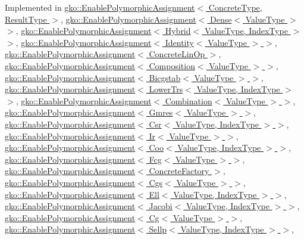 Implemented in \hyperlink{classgko_1_1EnablePolymorphicAssignment_a6b7e6872e96084636f8ab5091063ada8}{gko\+::\+Enable\+Polymorphic\+Assignment$<$ Concrete\+Type, Result\+Type $>$}, \hyperlink{classgko_1_1EnablePolymorphicAssignment_a6b7e6872e96084636f8ab5091063ada8}{gko\+::\+Enable\+Polymorphic\+Assignment$<$ Dense$<$ Value\+Type $>$ $>$}, \hyperlink{classgko_1_1EnablePolymorphicAssignment_a6b7e6872e96084636f8ab5091063ada8}{gko\+::\+Enable\+Polymorphic\+Assignment$<$ Hybrid$<$ Value\+Type, Index\+Type $>$ $>$}, \hyperlink{classgko_1_1EnablePolymorphicAssignment_a6b7e6872e96084636f8ab5091063ada8}{gko\+::\+Enable\+Polymorphic\+Assignment$<$ Identity$<$ Value\+Type $>$ $>$}, \hyperlink{classgko_1_1EnablePolymorphicAssignment_a6b7e6872e96084636f8ab5091063ada8}{gko\+::\+Enable\+Polymorphic\+Assignment$<$ Concrete\+Lin\+Op $>$}, \hyperlink{classgko_1_1EnablePolymorphicAssignment_a6b7e6872e96084636f8ab5091063ada8}{gko\+::\+Enable\+Polymorphic\+Assignment$<$ Composition$<$ Value\+Type $>$ $>$}, \hyperlink{classgko_1_1EnablePolymorphicAssignment_a6b7e6872e96084636f8ab5091063ada8}{gko\+::\+Enable\+Polymorphic\+Assignment$<$ Bicgstab$<$ Value\+Type $>$ $>$}, \hyperlink{classgko_1_1EnablePolymorphicAssignment_a6b7e6872e96084636f8ab5091063ada8}{gko\+::\+Enable\+Polymorphic\+Assignment$<$ Lower\+Trs$<$ Value\+Type, Index\+Type $>$ $>$}, \hyperlink{classgko_1_1EnablePolymorphicAssignment_a6b7e6872e96084636f8ab5091063ada8}{gko\+::\+Enable\+Polymorphic\+Assignment$<$ Combination$<$ Value\+Type $>$ $>$}, \hyperlink{classgko_1_1EnablePolymorphicAssignment_a6b7e6872e96084636f8ab5091063ada8}{gko\+::\+Enable\+Polymorphic\+Assignment$<$ Gmres$<$ Value\+Type $>$ $>$}, \hyperlink{classgko_1_1EnablePolymorphicAssignment_a6b7e6872e96084636f8ab5091063ada8}{gko\+::\+Enable\+Polymorphic\+Assignment$<$ Csr$<$ Value\+Type, Index\+Type $>$ $>$}, \hyperlink{classgko_1_1EnablePolymorphicAssignment_a6b7e6872e96084636f8ab5091063ada8}{gko\+::\+Enable\+Polymorphic\+Assignment$<$ Ir$<$ Value\+Type $>$ $>$}, \hyperlink{classgko_1_1EnablePolymorphicAssignment_a6b7e6872e96084636f8ab5091063ada8}{gko\+::\+Enable\+Polymorphic\+Assignment$<$ Coo$<$ Value\+Type, Index\+Type $>$ $>$}, \hyperlink{classgko_1_1EnablePolymorphicAssignment_a6b7e6872e96084636f8ab5091063ada8}{gko\+::\+Enable\+Polymorphic\+Assignment$<$ Fcg$<$ Value\+Type $>$ $>$}, \hyperlink{classgko_1_1EnablePolymorphicAssignment_a6b7e6872e96084636f8ab5091063ada8}{gko\+::\+Enable\+Polymorphic\+Assignment$<$ Concrete\+Factory $>$}, \hyperlink{classgko_1_1EnablePolymorphicAssignment_a6b7e6872e96084636f8ab5091063ada8}{gko\+::\+Enable\+Polymorphic\+Assignment$<$ Cgs$<$ Value\+Type $>$ $>$}, \hyperlink{classgko_1_1EnablePolymorphicAssignment_a6b7e6872e96084636f8ab5091063ada8}{gko\+::\+Enable\+Polymorphic\+Assignment$<$ Ell$<$ Value\+Type, Index\+Type $>$ $>$}, \hyperlink{classgko_1_1EnablePolymorphicAssignment_a6b7e6872e96084636f8ab5091063ada8}{gko\+::\+Enable\+Polymorphic\+Assignment$<$ Jacobi$<$ Value\+Type, Index\+Type $>$ $>$}, \hyperlink{classgko_1_1EnablePolymorphicAssignment_a6b7e6872e96084636f8ab5091063ada8}{gko\+::\+Enable\+Polymorphic\+Assignment$<$ Cg$<$ Value\+Type $>$ $>$}, \hyperlink{classgko_1_1EnablePolymorphicAssignment_a6b7e6872e96084636f8ab5091063ada8}{gko\+::\+Enable\+Polymorphic\+Assignment$<$ Sellp$<$ Value\+Type, Index\+Type $>$ $>$}, 